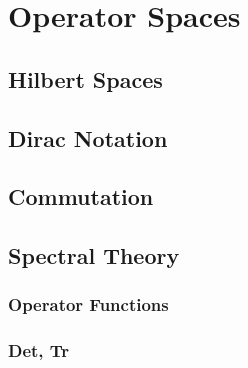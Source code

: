 \chapter{Operator Spaces}
\section{Hilbert Spaces}
\section{Dirac Notation}
\section{Commutation}
\section{Spectral Theory}
\subsection{Operator Functions}
\subsection{Det, Tr}
